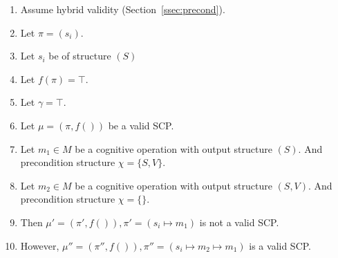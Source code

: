 \begin{bulletProof} \label{proof:insertionSearch}

\begin{enumerate}
\item Assume hybrid validity (Section~\ref{ssec:precond}).
\item Let $\pi=(s_i)$.
\item Let $s_i$ be of structure $(S)$
\item Let $f(\pi)=\top$.
\item Let $\gamma = \top$.
\item Let $\mu=(\pi,f())$ be a valid SCP.
\item Let $m_1 \in M$ be a cognitive operation with output structure $(S)$. And precondition structure $\chi=\{S,V\}$.
\item Let $m_2 \in M$ be a cognitive operation with output structure $(S,V)$. And precondition structure $\chi=\{\}$.
\item Then $\mu'=(\pi',f()), \pi'=(s_i \longmapsto m_1)$ is not a valid SCP.
\item However, $\mu''=(\pi'',f()), \pi''=(s_i \longmapsto m_2 \longmapsto m_1)$ is a valid SCP.
\end{enumerate}
\end{bulletProof}







